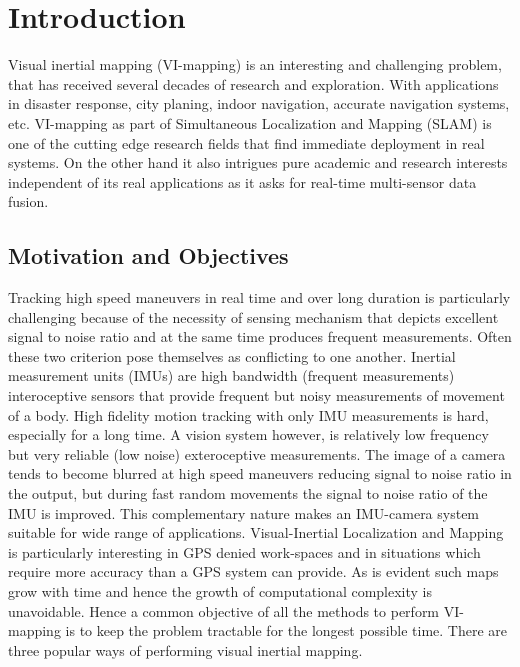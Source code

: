 \chapter{Introduction}
\label{sec:introduction}

Visual inertial mapping (VI-mapping) is an interesting and challenging problem, that has received several decades of research and exploration. With applications in disaster response, city planing, indoor navigation, accurate navigation systems, etc. VI-mapping as part of Simultaneous Localization and Mapping (SLAM) is one of the cutting edge research fields that find immediate deployment in real systems. On the other hand it also intrigues pure academic and research interests independent of its real applications as it asks for real-time multi-sensor data fusion.

\section{Motivation and Objectives}
Tracking high speed maneuvers in real time and over long duration is particularly challenging because of the necessity of sensing mechanism that depicts excellent signal to noise ratio and at the same time produces frequent measurements. Often these two criterion pose themselves as conflicting to one another. Inertial measurement units (IMUs) are high bandwidth (frequent measurements) interoceptive sensors that provide frequent but noisy measurements of movement of a body. High fidelity motion tracking with only IMU measurements is hard, especially for a long time. A vision system however, is relatively low frequency but very reliable (low noise) exteroceptive measurements. The image of a camera tends to become blurred at high speed maneuvers reducing signal to noise ratio in the output, but during fast random movements the signal to noise ratio of the IMU is improved. This complementary nature makes an IMU-camera system suitable for wide range of applications. Visual-Inertial Localization and Mapping is particularly interesting in GPS denied work-spaces and in situations which require more accuracy than a GPS system can provide. As is evident such maps grow with time and hence the growth of computational complexity is unavoidable. Hence a common objective of all the methods to perform VI-mapping is to keep the problem tractable for the longest possible time. There are three popular ways of performing visual inertial mapping.
